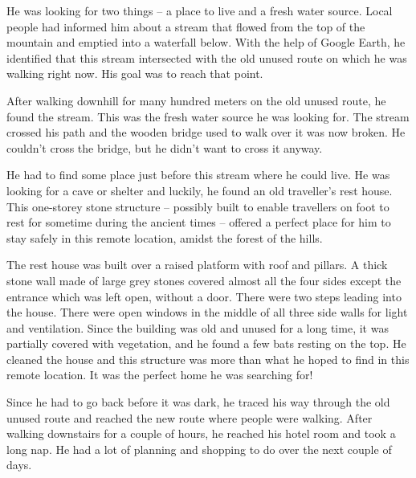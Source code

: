 He was looking for two things – a place to live and a fresh water source. Local
people had informed him about a stream that flowed from the top of the mountain
and emptied into a waterfall below. With the help of Google Earth, he identified
that this stream intersected with the old unused route on which he was walking
right now. His goal was to reach that point.

After walking downhill for many hundred meters on the old unused route, he found
the stream. This was the fresh water source he was looking for. The stream
crossed his path and the wooden bridge used to walk over it was now broken. He
couldn't cross the bridge, but he didn't want to cross it anyway.

He had to find some place just before this stream where he could live. He was
looking for a cave or shelter and luckily, he found an old traveller's rest
house. This one-storey stone structure – possibly built to enable travellers on
foot to rest for sometime during the ancient times – offered a perfect place for
him to stay safely in this remote location, amidst the forest of the hills.

The rest house was built over a raised platform with roof and pillars. A thick
stone wall made of large grey stones covered almost all the four sides except
the entrance which was left open, without a door. There were two steps leading
into the house. There were open windows in the middle of all three side walls
for light and ventilation. Since the building was old and unused for a long
time, it was partially covered with vegetation, and he found a few bats resting
on the top. He cleaned the house and this structure was more than what he hoped
to find in this remote location. It was the perfect home he was searching for!

Since he had to go back before it was dark, he traced his way through the old
unused route and reached the new route where people were walking. After walking
downstairs for a couple of hours, he reached his hotel room and took a long nap.
He had a lot of planning and shopping to do over the next couple of days.